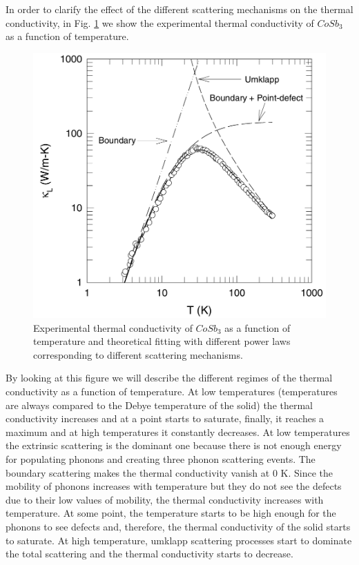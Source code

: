 In order to clarify the effect of the different scattering mechanisms on the thermal conductivity, in Fig. \ref{prototypical} we show the experimental thermal conductivity of $CoSb_{3}$\cite{yang2002influence} as a 
function of temperature.
\begin{figure}[h]
\begin{center}
\includegraphics[width=0.7\linewidth]{Figures/prototypical-solid.png}
\caption[Thermal conductivity of $CoSb_{3}$]{Experimental thermal conductivity of $CoSb_{3}$\cite{yang2002influence} as a function of temperature and theoretical fitting with different power laws corresponding to different 
scattering mechanisms.}
\label{prototypical}
\end{center}
\end{figure}
By looking at this figure we will describe the different regimes of the thermal conductivity as a function of temperature. At low temperatures (temperatures are always 
compared to the Debye temperature of the solid) the thermal conductivity increases and at a point starts to saturate, finally, it reaches a maximum and at high temperatures it constantly decreases. At low 
temperatures the extrinsic scattering is the dominant one because there is not enough energy for populating phonons and creating three phonon scattering events. The boundary scattering makes the thermal conductivity vanish at 0 K. 
Since the mobility of phonons increases with temperature but they do not see the defects due to their low values of 
mobility, the thermal conductivity increases with temperature. At some point, the temperature starts to be high 
enough for the phonons to see defects and, therefore, the thermal conductivity of the solid starts to saturate. At 
high temperature, umklapp scattering processes start to dominate the total scattering and the thermal conductivity 
starts to decrease. \\

